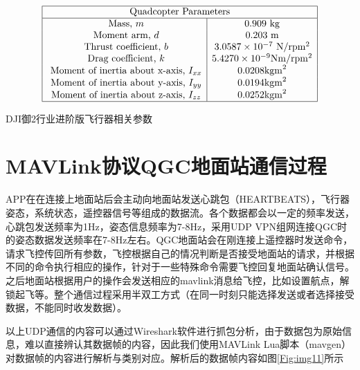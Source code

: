\begin{table}[ht]
  \centering
  $$
  \begin{array}{|c|c|}
    \hline \multicolumn{2}{|c|}{\text { Quadcopter Parameters }} \\
    \hline \text { Mass, } m & 0.909 \mathrm{~kg} \\
    \text { Moment arm, } d & 0.203 \mathrm{~m} \\
    \text { Thrust coefficient, } b & 3.0587 \times 10^{-7} \mathrm{~N} / \mathrm{rpm}^{2} \\
    \text { Drag coefficient, } k & 5.4270 \times 10^{-9} \mathrm{Nm} / \mathrm{rpm}^{2} \\
    \text { Moment of inertia about x-axis, } I_{x x} & 0.0208 \mathrm{kgm}^{2} \\
    \text { Moment of inertia about y-axis, } I_{y y} & 0.0194 \mathrm{kgm}^{2} \\
    \text { Moment of inertia about z-axis, } I_{z z} & 0.0252 \mathrm{kgm}^{2} \\
    \hline
  \end{array}
  $$
  \caption{DJI御2行业进阶版飞行器相关参数}\label{Fig:table1}
\end{table}

\section{MAVLink协议QGC地面站通信过程}

APP在在连接上地面站后会主动向地面站发送心跳包（HEARTBEATS），飞行器姿态，系统状态，遥控器信号等组成的数据流。各个数据都会以一定的频率发送，心跳包发送频率为1Hz，姿态信息频率为7-8Hz，采用UDP VPN组网连接QGC时的姿态数据发送频率在7-8Hz左右。QGC地面站会在刚连接上遥控器时发送命令，请求飞控传回所有参数，飞控根据自己的情况判断是否接受地面站的请求，并根据不同的命令执行相应的操作，针对于一些特殊命令需要飞控回复地面站确认信号。之后地面站根据用户的操作会发送相应的mavlink消息给飞控，比如设置航点，解锁起飞等。整个通信过程采用半双工方式（在同一时刻只能选择发送或者选择接受数据，不能同时收发数据）\cite{ArtE5}。

以上UDP通信的内容可以通过Wireshark软件进行抓包分析，由于数据包为原始信息，难以直接辨认其数据帧的内容，因此我们使用MAVLink Lua脚本（mavgen）对数据帧的内容进行解析与类别对应。解析后的数据帧内容如图\ref{Fig:img11}所示

